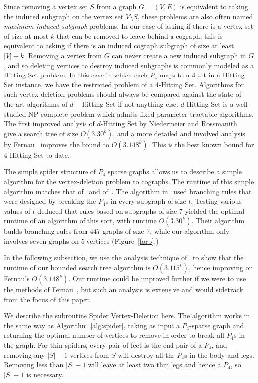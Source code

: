 \documentclass{llncs}
\begin{document}
Since removing a vertex set $S$ from a graph $G=(V,E)$ is equivalent to taking the induced subgraph on the vertex set $V\setminus S$, these problems are also often named \emph{maximum induced subgraph} problems. In our case of asking if there is a vertex set of size at most $k$ that can be removed to leave behind a cograph, this is equivalent to asking if there is an induced cograph subgraph of size at least $|V|-k$. Removing a vertex from $G$ can never create a new induced subgraph in $G$, and so deleting vertices to destroy induced subgraphs is commonly modeled as a {\sc Hitting Set} problem. In this case in which each $P_4$ maps to a 4-set in a {\sc Hitting Set} instance, we have the restricted problem of a 4-{\sc Hitting Set}. Algorithms for such vertex-deletion problems should always be compared against the state-of-the-art algorithms of $d-${\sc Hitting Set} if not anything else. $d$-{\sc Hitting Set} is a well-studied NP-complete problem which admits fixed-parameter tractable algorithms. The first improved analysis of $d$-{\sc Hitting Set} by Niedermeier and Rossmanith~\cite{NiRo} give a search tree of size $O(3.30^k)$, and a more detailed and involved analysis by Fernau~\cite{Fer} improves the bound to $O(3.148^k)$. This is the best known bound for $4$-{\sc Hitting Set} to date.

The simple spider structure of $P_4$ sparse graphs allows us to describe a simple algorithm for the vertex-deletion problem to cographs. The runtime of this simple algorithm matches that of~\cite{GGHN} and of~\cite{NiRo}. The algorithm in~\cite{GGHN} used branching rules that were designed by breaking the $P_4$s in every subgraph of size $t$. Testing various values of $t$ deduced that rules based on subgraphs of size 7 yielded the optimal runtime of an algorithm of this sort, with runtime $O(3.30^k)$. Their algorithm builds branching rules from 447 graphs of size 7, while our algorithm only involves seven graphs on 5 vertices (Figure~\ref{forb}.)

In the following subsection, we use the analysis technique of~\cite{NiRo} to show that the runtime of our bounded search tree algorithm is $O(3.115^k)$, hence improving on Fernau's $O(3.148^k)$. Our runtime could be improved further if we were to use the methods of Fernau~\cite{Fer}, but such an analysis is extensive and would sidetrack from the focus of this paper.

We describe the subroutine {\sc Spider Vertex-Deletion} here. The algorithm works in the same way as Algorithm~\ref{alg:spider}, taking as input a $P_4$-sparse graph and returning the optimal number of vertices to remove in order to break all $P_4$s in the graph. For thin spiders, every pair of feet is the end-pair of a $P_4$, and removing any $|S|-1$ vertices from $S$ will destroy all the $P_4$s in the body and legs. Removing less than $|S|-1$ will leave at least two thin legs and hence a $P_4$, so $|S|-1$ is necessary.
\end{document}
